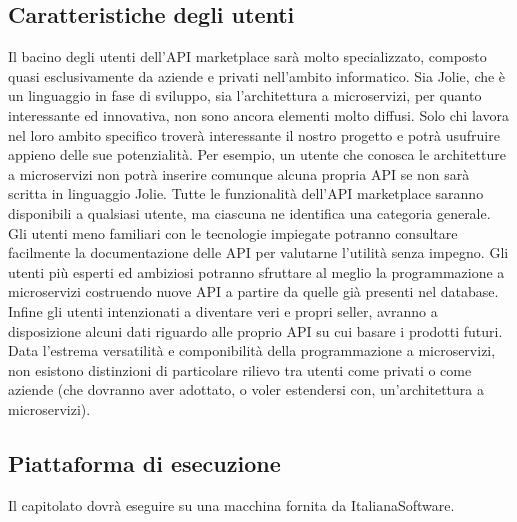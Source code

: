 \subsection{Caratteristiche degli utenti}
Il bacino degli utenti dell'API marketplace sarà molto specializzato, composto quasi esclusivamente da aziende e privati nell'ambito informatico. Sia Jolie, che è un linguaggio in fase di sviluppo, sia l'architettura a microservizi, per quanto interessante ed innovativa, non sono ancora elementi molto diffusi. Solo chi lavora nel loro ambito specifico troverà interessante il nostro progetto e potrà usufruire appieno delle sue potenzialità. Per esempio, un utente che conosca le architetture a microservizi non potrà inserire comunque alcuna propria API se non sarà scritta in linguaggio Jolie. Tutte le funzionalità dell'API marketplace saranno disponibili a qualsiasi utente, ma ciascuna ne identifica una categoria generale. Gli utenti meno familiari con le tecnologie impiegate potranno consultare facilmente la documentazione delle API per valutarne l'utilità senza impegno. Gli utenti più esperti ed ambiziosi potranno sfruttare al meglio la programmazione a microservizi costruendo nuove API a partire da quelle già presenti nel database. Infine gli utenti intenzionati a diventare veri e propri seller, avranno a disposizione alcuni dati riguardo alle proprio API su cui basare i prodotti futuri. Data l'estrema versatilità e componibilità della programmazione a microservizi, non esistono distinzioni di particolare rilievo tra utenti come privati o come aziende (che dovranno aver adottato, o voler estendersi con, un'architettura a microservizi).

\subsection{Piattaforma di esecuzione}
Il capitolato dovrà eseguire su una macchina fornita da ItalianaSoftware.


